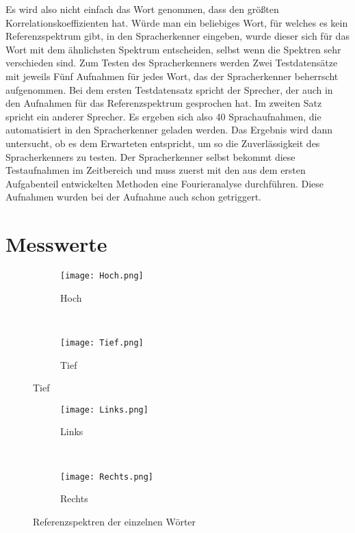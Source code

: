 Es wird also nicht einfach das Wort genommen, dass den größten Korrelationskoeffizienten hat. Würde man ein beliebiges Wort, für welches es kein Referenzspektrum gibt, in den Spracherkenner eingeben, wurde dieser sich für das Wort mit dem ähnlichsten Spektrum entscheiden, selbst wenn die Spektren sehr verschieden sind.
Zum Testen des Spracherkenners werden Zwei Testdatensätze mit jeweils Fünf Aufnahmen für jedes Wort, das der Spracherkenner beherrscht aufgenommen. Bei dem ersten Testdatensatz spricht der Sprecher, der auch in den Aufnahmen für das Referenzspektrum gesprochen hat.
Im zweiten Satz spricht ein anderer Sprecher. Es ergeben sich also 40 Sprachaufnahmen, die automatisiert in den Spracherkenner geladen werden. Das Ergebnis wird dann untersucht, ob es dem Erwarteten entspricht, um so die Zuverlässigkeit des Spracherkenners zu testen.
Der Spracherkenner selbst bekommt diese Testaufnahmen im Zeitbereich und muss zuerst mit den aus dem ersten Aufgabenteil entwickelten Methoden eine Fourieranalyse durchführen. Diese Aufnahmen wurden bei der Aufnahme auch schon getriggert.
\newpage
\section{Messwerte}
\label{chap:VERSUCH_2_MESSWERTE}
\begin{figure}[H]
    \centering
    \begin{subfigure}[b]{0.49\textwidth}
        \texttt{[image: Hoch.png]}
        \caption{Hoch}
        \label{fig:Hoch}
    \end{subfigure}
    ~ %
    \begin{subfigure}[b]{0.49\textwidth}
        \texttt{[image: Tief.png]}
        \caption{Tief}
        \label{fig:Tief}
    \end{subfigure}
\end{figure}

\begin{figure}[H]
    \centering
    \begin{subfigure}[b]{0.49\textwidth}        			\texttt{[image: Links.png]}
    	\caption{Links}
        \label{fig:Links}
    \end{subfigure}
    ~
    \begin{subfigure}[b]{0.49\textwidth}        		   \texttt{[image: Rechts.png]}
       \caption{Rechts}
       \label{fig:Rechts}
    \end{subfigure}
\caption{Referenzspektren der einzelnen Wörter}
\label{fig:RefSpektren}
\end{figure}

